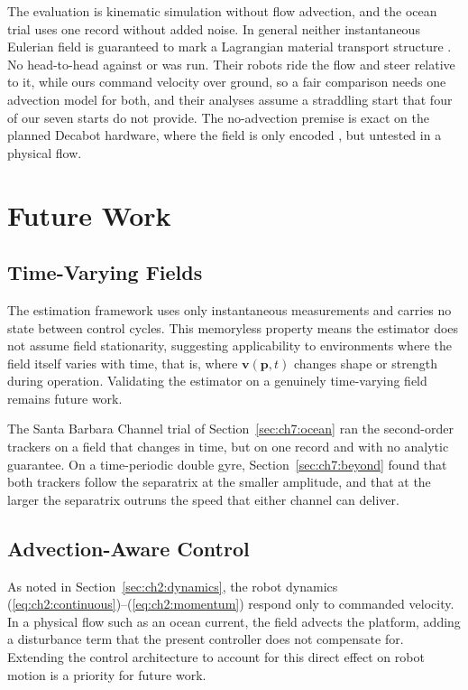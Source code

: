 The evaluation is kinematic simulation without flow advection, and the
ocean trial uses one record without added noise. In general neither
instantaneous Eulerian field is guaranteed to mark a Lagrangian material
transport structure \cite{51}. No head-to-head against \cite{27,63,28} or
\cite{6} was run. Their robots ride the flow and steer relative to it,
while ours command velocity over ground, so a fair comparison needs one
advection model for both, and their analyses assume a straddling start
that four of our seven starts do not provide. The no-advection premise is
exact on the planned Decabot hardware, where the field is only encoded
\cite{30}, but untested in a physical flow.

\section{Future Work}
\label{sec:ch9:future}

\subsection{Time-Varying Fields}
\label{sec:ch9:time_varying}

The estimation framework uses only instantaneous measurements and carries no state between control cycles. This memoryless property means the estimator does not assume field stationarity, suggesting applicability to environments where the field itself varies with time, that is, where $\mathbf{v}(\mathbf{p}, t)$ changes shape or strength during operation. Validating the estimator on a genuinely time-varying field remains future work.

The Santa Barbara Channel trial of Section~\ref{sec:ch7:ocean} ran the
second-order trackers on a field that changes in time, but on one record
and with no analytic guarantee. On a time-periodic double gyre,
Section~\ref{sec:ch7:beyond} found that both trackers follow the separatrix
at the smaller amplitude, and that at the larger the separatrix outruns the
speed that either channel can deliver.

\subsection{Advection-Aware Control}
\label{sec:ch9:advection}

As noted in Section~\ref{sec:ch2:dynamics}, the robot dynamics (\ref{eq:ch2:continuous})--(\ref{eq:ch2:momentum}) respond only to commanded velocity. In a physical flow such as an ocean current, the field advects the platform, adding a disturbance term that the present controller does not compensate for. Extending the control architecture to account for this direct effect on robot motion is a priority for future work.

